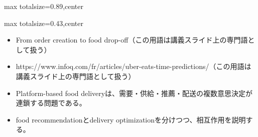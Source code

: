 \begin{minipage}[t]{0.58\textwidth}
\begin{adjustbox}{max totalsize={\textwidth}{0.89\textheight},center}
\begin{minipage}{\textwidth}
\end{minipage}
\end{adjustbox}
\end{minipage}


\clearpage
{}
\begin{minipage}[t]{0.405\textwidth}
\begin{adjustbox}{max totalsize={\textwidth}{0.43\textheight},center}
\begin{minipage}{\textwidth}\scriptsize
{}\begin{itemize}
\item From order creation to food drop-off（この用語は講義スライド上の専門語として扱う）
\item https://www.infoq.com/fr/articles/uber-eats-time-predictions/（この用語は講義スライド上の専門語として扱う）
\end{itemize}\begin{itemize}
\item Platform-based food deliveryは、需要・供給・推薦・配送の複数意思決定が連鎖する問題である。
\item food recommendationとdelivery optimizationを分けつつ、相互作用を説明する。
\end{itemize}
\end{minipage}
\end{adjustbox}
\end{minipage}\hfill
